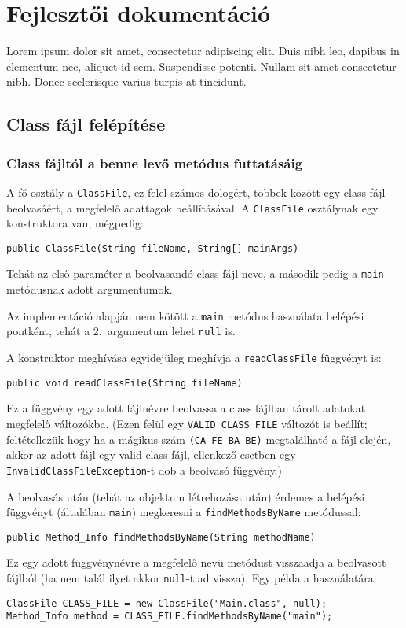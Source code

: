 \chapter{Fejlesztői dokumentáció}
\label{ch:impl}

Lorem ipsum dolor sit amet, consectetur adipiscing elit. Duis nibh leo, dapibus in elementum nec, aliquet id sem. Suspendisse potenti. Nullam sit amet consectetur nibh. Donec scelerisque varius turpis at tincidunt.

\section{Class fájl felépítése}

\subsection{Class fájltól a benne levő metódus futtatásáig}

A fő osztály a \lstinline{ClassFile}, ez felel számos dologért, többek között egy class fájl beolvasáért, a megfelelő adattagok beállításával. A \lstinline{ClassFile} osztálynak egy konstruktora van, mégpedig:
\begin{verbatim}
public ClassFile(String fileName, String[] mainArgs)
\end{verbatim}
Tehát az első paraméter a beolvasandó class fájl neve, a második pedig a \lstinline{main} metódusnak adott argumentumok.

Az implementáció alapján nem kötött a \lstinline{main} metódus használata belépési pontként, tehát a 2.\ argumentum lehet \lstinline{null} is.

A konstruktor meghívása egyidejüleg meghívja a \lstinline{readClassFile} függvényt is:
\begin{verbatim}
public void readClassFile(String fileName)
\end{verbatim}
Ez a függvény egy adott fájlnévre beolvassa a class fájlban tárolt adatokat megfelelő változókba.
(Ezen felül egy \lstinline{VALID_CLASS_FILE} változót is beállít; feltétellezük hogy ha a mágikus szám \lstinline{(CA FE BA BE)} megtalálható a fájl elején, akkor az adott fájl egy valid class fájl, ellenkező esetben egy \lstinline{InvalidClassFileException}-t dob a beolvasó függvény.)

A beolvasás után (tehát az objektum létrehozása után) érdemes a belépési függvényt (általában \lstinline{main}) megkeresni a \lstinline{findMethodsByName} metódussal:
\begin{verbatim}
public Method_Info findMethodsByName(String methodName)
\end{verbatim}
Ez egy adott függvénynévre a megfelelő nevü metódust visszaadja a beolvasott fájlból (ha nem talál ilyet akkor \lstinline{null}-t ad vissza).
Egy példa a használatára:
\begin{verbatim}
ClassFile CLASS_FILE = new ClassFile("Main.class", null);
Method_Info method = CLASS_FILE.findMethodsByName("main");
\end{verbatim}

